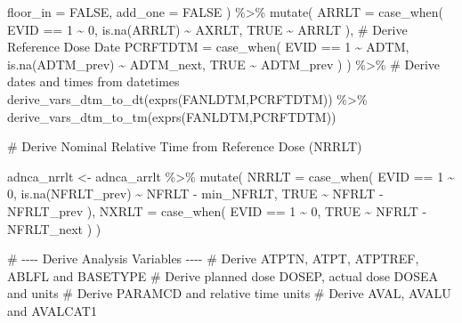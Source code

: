 \documentclass[
  letterpaper,
  DIV=11,
  numbers=noendperiod]{scrreprt}
\newenvironment{Shaded}{\begin{snugshade}}{\end{snugshade}}
\newcommand{\AttributeTok}[1]{\textcolor[rgb]{0.40,0.45,0.13}{#1}}
\newcommand{\CommentTok}[1]{\textcolor[rgb]{0.37,0.37,0.37}{#1}}
\newcommand{\ConstantTok}[1]{\textcolor[rgb]{0.56,0.35,0.01}{#1}}
\newcommand{\DecValTok}[1]{\textcolor[rgb]{0.68,0.00,0.00}{#1}}
\newcommand{\FunctionTok}[1]{\textcolor[rgb]{0.28,0.35,0.67}{#1}}
\newcommand{\NormalTok}[1]{\textcolor[rgb]{0.00,0.23,0.31}{#1}}
\newcommand{\OtherTok}[1]{\textcolor[rgb]{0.00,0.23,0.31}{#1}}
\newcommand{\SpecialCharTok}[1]{\textcolor[rgb]{0.37,0.37,0.37}{#1}}
\begin{document}
\begin{Shaded}
\begin{Highlighting}[]
    \AttributeTok{floor\_in =} \ConstantTok{FALSE}\NormalTok{,}
    \AttributeTok{add\_one =} \ConstantTok{FALSE}
\NormalTok{  ) }\SpecialCharTok{\%\textgreater{}\%}
  \FunctionTok{mutate}\NormalTok{(}
    \AttributeTok{ARRLT =} \FunctionTok{case\_when}\NormalTok{(}
\NormalTok{      EVID }\SpecialCharTok{==} \DecValTok{1} \SpecialCharTok{\textasciitilde{}} \DecValTok{0}\NormalTok{,}
      \FunctionTok{is.na}\NormalTok{(ARRLT) }\SpecialCharTok{\textasciitilde{}}\NormalTok{ AXRLT,}
      \ConstantTok{TRUE} \SpecialCharTok{\textasciitilde{}}\NormalTok{ ARRLT}
\NormalTok{    ),}
    \CommentTok{\# Derive Reference Dose Date}
    \AttributeTok{PCRFTDTM =} \FunctionTok{case\_when}\NormalTok{(}
\NormalTok{      EVID }\SpecialCharTok{==} \DecValTok{1} \SpecialCharTok{\textasciitilde{}}\NormalTok{ ADTM,}
      \FunctionTok{is.na}\NormalTok{(ADTM\_prev) }\SpecialCharTok{\textasciitilde{}}\NormalTok{ ADTM\_next,}
      \ConstantTok{TRUE} \SpecialCharTok{\textasciitilde{}}\NormalTok{ ADTM\_prev}
\NormalTok{    )}
\NormalTok{  ) }\SpecialCharTok{\%\textgreater{}\%}
  \CommentTok{\# Derive dates and times from datetimes}
  \FunctionTok{derive\_vars\_dtm\_to\_dt}\NormalTok{(}\FunctionTok{exprs}\NormalTok{(FANLDTM,PCRFTDTM)) }\SpecialCharTok{\%\textgreater{}\%}
  \FunctionTok{derive\_vars\_dtm\_to\_tm}\NormalTok{(}\FunctionTok{exprs}\NormalTok{(FANLDTM,PCRFTDTM))}

\CommentTok{\# Derive Nominal Relative Time from Reference Dose (NRRLT)}

\NormalTok{adnca\_nrrlt }\OtherTok{\textless{}{-}}\NormalTok{ adnca\_arrlt }\SpecialCharTok{\%\textgreater{}\%}
  \FunctionTok{mutate}\NormalTok{(}
    \AttributeTok{NRRLT =} \FunctionTok{case\_when}\NormalTok{(}
\NormalTok{      EVID }\SpecialCharTok{==} \DecValTok{1} \SpecialCharTok{\textasciitilde{}} \DecValTok{0}\NormalTok{,}
      \FunctionTok{is.na}\NormalTok{(NFRLT\_prev) }\SpecialCharTok{\textasciitilde{}}\NormalTok{ NFRLT }\SpecialCharTok{{-}}\NormalTok{ min\_NFRLT,}
      \ConstantTok{TRUE} \SpecialCharTok{\textasciitilde{}}\NormalTok{ NFRLT }\SpecialCharTok{{-}}\NormalTok{ NFRLT\_prev}
\NormalTok{    ),}
    \AttributeTok{NXRLT =} \FunctionTok{case\_when}\NormalTok{(}
\NormalTok{      EVID }\SpecialCharTok{==} \DecValTok{1} \SpecialCharTok{\textasciitilde{}} \DecValTok{0}\NormalTok{,}
      \ConstantTok{TRUE} \SpecialCharTok{\textasciitilde{}}\NormalTok{ NFRLT }\SpecialCharTok{{-}}\NormalTok{ NFRLT\_next}
\NormalTok{    )}
\NormalTok{  )}

\CommentTok{\# {-}{-}{-}{-} Derive Analysis Variables {-}{-}{-}{-}}
\CommentTok{\# Derive ATPTN, ATPT, ATPTREF, ABLFL and BASETYPE}
\CommentTok{\# Derive planned dose DOSEP, actual dose DOSEA and units}
\CommentTok{\# Derive PARAMCD and relative time units}
\CommentTok{\# Derive AVAL, AVALU and AVALCAT1}


\end{Highlighting}
\end{Shaded}
\end{document}
